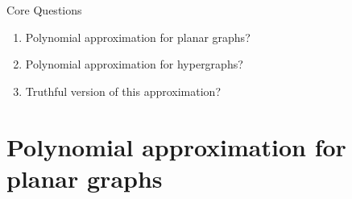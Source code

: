 \documentclass[aspectratio=169]{beamer}
\begin{document}
\begin{frame}{Core Questions}
    \begin{enumerate}
        \item Polynomial approximation for \alert{planar graphs}?
        \item Polynomial approximation for \alert{hypergraphs}?
        \item \alert{Truthful version} of this approximation?
    \end{enumerate}
\end{frame}

{\section{Polynomial approximation for planar graphs}}
\end{document}
